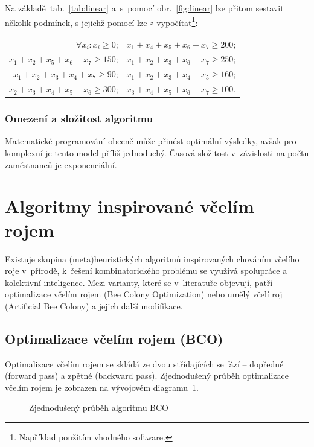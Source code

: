 \documentclass[twoside]{ctuthesis}
\begin{document}
\begin{enumerate}[label=\textbf{O\arabic*.}]
Na základě~tab.~\ref{tab:linear} a~s~pomocí obr.~\ref{fig:linear} lze přitom sestavit několik podmínek, s jejichž pomocí lze $z$ vypočítat\footnote{Například použítím vhodného software.}:
\begin{center}
	\begin{tabular}{rl}
		$\forall x_i: x_i \geq 0$; & $x_1 + x_4 + x_5 + x_6 + x_7 \geq 200$; \\
		$x_1 + x_2 + x_5 + x_6 + x_7 \geq 150$; & $x_1 + x_2 + x_3 + x_6 + x_7 \geq 250$;\\
		$x_1 + x_2 + x_3 + x_4 + x_7 \geq 90$; & $x_1 + x_2 + x_3 + x_4 + x_5 \geq 160$; \\
		$x_2 + x_3 + x_4 + x_5 + x_6 \geq 300$; & $x_3 + x_4 + x_5 + x_6 + x_7 \geq 100$.
	\end{tabular}
\end{center}

\subsubsection{Omezení a složitost algoritmu}
Matematické programování obecně může přinést optimální výsledky, avšak pro komplexní je tento model příliš jednoduchý. \cite{burke2004state} Časová složitost v~závislosti na počtu zaměstnanců je exponenciální. \cite{chen2016comparison}


\newpage
\section{Algoritmy inspirované včelím rojem}
Existuje skupina (meta)heuristických algoritmů inspirovaných chováním včelího roje v~přírodě, k~řešení kombinatorického problému se využívá spolupráce a kolektivní inteligence. Mezi varianty, které se v~literatuře objevují, patří optimalizace včelím rojem (Bee Colony Optimization) nebo umělý včelí roj (Artificial Bee Colony) a jejich další modifikace.

\subsection{Optimalizace včelím rojem (BCO)}
Optimalizace včelím rojem se skládá ze dvou střídajících se fází -- dopředné (forward pass) a zpětné (backward pass). Zjednodušený průběh optimalizace včelím rojem je zobrazen na vývojovém diagramu~\ref{fig:bcoflow}.
\begin{figure}[h]
	
	\caption{Zjednodušený průběh algoritmu BCO}
	\label{fig:bcoflow}
\end{figure}


\end{enumerate}
\end{document}
